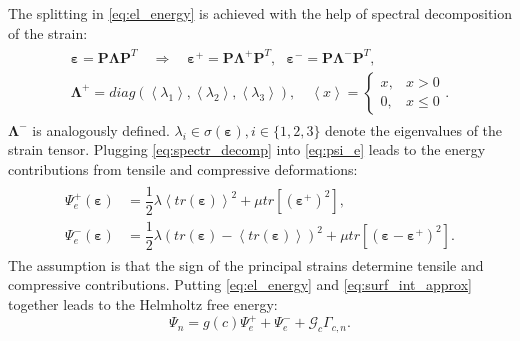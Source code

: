 The splitting in \eqref{eq:el_energy} is achieved with the help of spectral decomposition of the strain:
\begin{align} \label{eq:spectr_decomp}
	\begin{aligned}
		\bm{\varepsilon} = \mathbf{P}\bm{\Lambda}\mathbf{P}^{T} \quad \Rightarrow \quad \bm{\varepsilon}^{+} = \mathbf{P}\bm{\Lambda}^{+}\mathbf{P}^{T}, \text{ } \bm{\varepsilon}^{-} = \mathbf{P}\bm{\Lambda}^{-}\mathbf{P}^{T}, \\
		\bm{\Lambda}^{+}=diag\left(\left<\lambda_{1}\right>,\left<\lambda_{2}\right>,\left<\lambda_{3}\right>\right), \quad \left<x\right>=\begin{cases}x, &x>0 \\ 0, & x\leq0\end{cases}.
	\end{aligned}
\end{align}
$\bm{\Lambda}^{-}$ is analogously                                                                                                                                                                                                                                                                                                                                                                                                                                                                                                          defined. $\lambda_{i}\in\sigma\left(\bm{\varepsilon}\right),i\in\{1,2,3\}$ denote the eigenvalues of the strain tensor. Plugging \eqref{eq:spectr_decomp} into \eqref{eq:psi_e} leads to the energy contributions from tensile and compressive deformations:
\begin{align} \label{eq:psi_e+-}
	\begin{aligned}
		\Psi_{e}^{+}\left(\bm{\varepsilon}\right) &= \dfrac{1}{2}\lambda\left<tr\left(\bm{\varepsilon}\right)\right>^{2}+\mu tr\left[\left(\bm{\varepsilon}^{+}\right)^{2}\right], \\
		\Psi_{e}^{-}\left(\bm{\varepsilon}\right) &= \dfrac{1}{2}\lambda\left(tr\left(\bm{\varepsilon}\right)-\left<tr\left(\bm{\varepsilon}\right)\right>\right)^{2}+\mu tr\left[\left(\bm{\varepsilon}-\bm{\varepsilon}^{+}\right)^{2}\right].
	\end{aligned}
\end{align}
The assumption is that the sign of the principal strains determine tensile and compressive contributions. Putting \eqref{eq:el_energy} and \eqref{eq:surf_int_approx} together leads to the Helmholtz free energy:
\begin{equation} \label{eq:Helmholtz}
	\Psi_{n}=g\left(c\right)\Psi_{e}^{+}+\Psi_{e}^{-}+\mathcal{G}_{c}\Gamma_{c,n}.
\end{equation}

